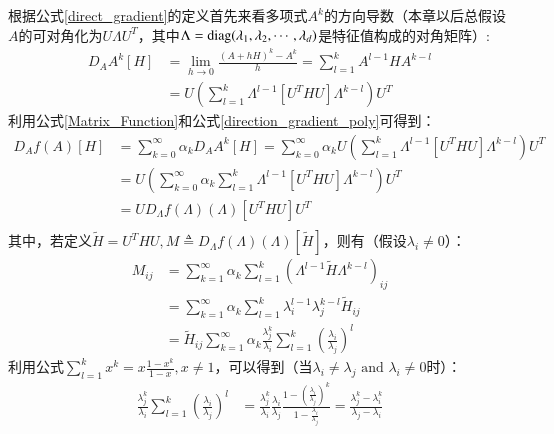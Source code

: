 根据公式\ref{direct_gradient}的定义首先来看多项式$A^{k}$的方向导数（本章以后总假设$A$的可对角化为$U\Lambda U^{T}$，其中$\Lambda={\rm diag}(\lambda_1,\lambda_2,\cdots,\lambda_d)$是特征值构成的对角矩阵）:
\begin{equation}
\label{direction_gradient_poly}
\begin{split}
D_{A}A^{k}[H]&=\lim_{h\rightarrow 0}\frac{(A+hH)^{k}-A^{k}}{h}=\sum_{l=1}^{k}A^{l-1}HA^{k-l}\\
&=U\left(\sum_{l=1}^{k}\Lambda^{l-1}[U^{T}HU]\Lambda^{k-l}\right)U^{T}
\end{split}
\end{equation}
利用公式\ref{Matrix_Function}和公式\ref{direction_gradient_poly}可得到：
\begin{equation}
\label{direction_gradient_fx}
\begin{split}
D_{A}f(A)[H]&=\sum_{k=0}^{\infty}\alpha_{k}D_{A}A^{k}[H]=\sum_{k=0}^{\infty}\alpha_{k}U\left(\sum_{l=1}^{k}\Lambda^{l-1}[U^{T}HU]\Lambda^{k-l}\right)U^{T}\\
&=U\left(\sum_{k=0}^{\infty}\alpha_{k}\sum_{l=1}^{k}\Lambda^{l-1}[U^{T}HU]\Lambda^{k-l}\right)U^{T}\\
&=UD_{\Lambda}f(\Lambda)(\Lambda)[U^{T}HU]U^{T}\\
\end{split}
\end{equation}
其中，若定义$\tilde{H}=U^{T}HU,M\triangleq D_{\Lambda}f(\Lambda)(\Lambda)[\tilde{H}]$，则有（假设$\lambda_{i} \neq 0$）：
\begin{equation}
\label{direction_gradient_M}
\begin{split}
M_{ij}&=\sum_{k=1}^{\infty} \alpha_{k}\sum_{l=1}^{k}(\Lambda^{l-1}\tilde{H}\Lambda^{k-l})_{ij}\\
&=\sum_{k=1}^{\infty} \alpha_{k}\sum_{l=1}^{k}\lambda_{i}^{l-1}\lambda_{j}^{k-l}\tilde{H}_{ij}\\
&=\tilde{H}_{ij}\sum_{k=1}^{\infty}\alpha_{k}\frac{\lambda_{j}^{k}}{\lambda_{i}}\sum_{l=1}^{k}\left(\frac{\lambda_i}{\lambda_j}\right)^{l}
\end{split}
\end{equation}
利用公式$\sum_{l=1}^{k}x^{k}=x\frac{1-x^{k}}{1-x},x \neq 1$，可以得到（当$\lambda_{i}\neq\lambda_{j}\text{ and }\lambda_i \neq 0$时）：
\begin{equation}
\label{Compute_Zij_1}
\begin{split}
\frac{\lambda_{j}^{k}}{\lambda_{i}}\sum_{l=1}^{k}\left(\frac{\lambda_i}{\lambda_j}\right)^{l}&=\frac{\lambda_{j}^{k}}{\lambda_{i}}\frac{\lambda_{i}}{\lambda_{j}}\frac{1-\left(\frac{\lambda_{i}}{\lambda_{j}}\right)^{k}}{1-\frac{\lambda_{i}}{\lambda_{j}}}=\frac{\lambda_{j}^{k}-\lambda_{i}^{k}}{\lambda_{j}-\lambda_{i}}
\end{split}
\end{equation}
